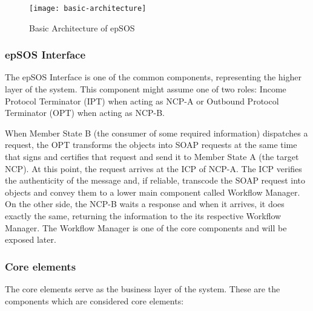 \begin{figure}[t]
\texttt{[image: basic-architecture]}
\caption[Basic Architecture of epSOS]{Basic Architecture of epSOS~\citep{EpSOS}}
\label{fig:epsos-architecture}
\end{figure}

\subsubsection{epSOS Interface}
The epSOS Interface is one of the common components, representing the higher layer of the system. This component might assume one of two roles: Income Protocol Terminator (IPT) when acting as NCP-A or Outbound Protocol Terminator (OPT) when acting as NCP-B.

When Member State B (the consumer of some required information) dispatches a request, the OPT transforms the objects into SOAP requests at the same time that signs and certifies that request and send it to Member State A (the target NCP). At this point, the request arrives at the ICP of NCP-A. The ICP verifies the authenticity of the message and, if reliable, transcode the SOAP request into objects and convey them to a lower main component called Workflow Manager. On the other side, the NCP-B waits a response and when it arrives, it does exactly the same, returning the information to the its respective Workflow Manager. The Workflow Manager is one of the core components and will be exposed later.

\subsubsection{Core elements}
The core elements serve as the business layer of the system. These are the components which are considered core elements:

